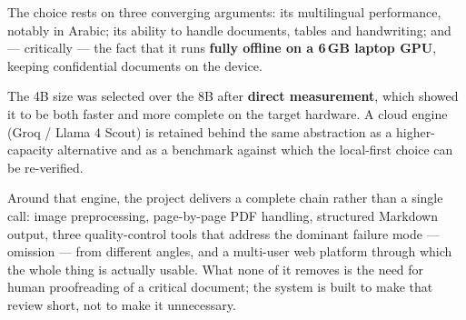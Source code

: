 \documentclass[11pt,a4paper]{article}
\begin{document}
The choice rests on three converging arguments: its multilingual performance,
notably in Arabic; its ability to handle documents, tables and handwriting; and
--- critically --- the fact that it runs \textbf{fully offline on a 6\,GB laptop
GPU}, keeping confidential documents on the device.

The 4B size was selected over the 8B after \textbf{direct measurement}, which
showed it to be both faster and more complete on the target hardware. A cloud
engine (Groq / Llama 4 Scout) is retained behind the same abstraction as a
higher-capacity alternative and as a benchmark against which the local-first
choice can be re-verified.

Around that engine, the project delivers a complete chain rather than a single
call: image preprocessing, page-by-page PDF handling, structured Markdown
output, three quality-control tools that address the dominant failure mode ---
omission --- from different angles, and a multi-user web platform through which
the whole thing is actually usable. What none of it removes is the need for
human proofreading of a critical document; the system is built to make that
review short, not to make it unnecessary.
\end{document}

